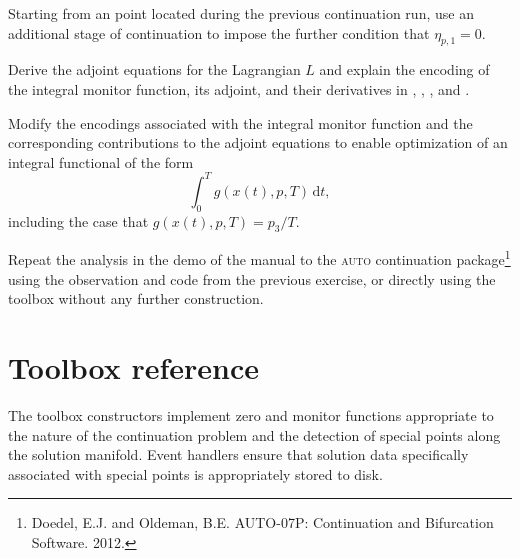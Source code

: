 \begin{exercises}
\item Starting from an  point located during the previous continuation run, use an additional stage of continuation to impose the further condition that $\eta_{p,1}=0$.
\item Derive the adjoint equations for the Lagrangian $L$ and explain the encoding of the integral monitor function, its adjoint, and their derivatives in , , , and .
\item Modify the encodings associated with the integral monitor function and the corresponding contributions to the adjoint equations to enable optimization of an integral functional of the form
\[
\int_0^T g(x(t),p,T)\,\mathrm{d}t,
\]
including the case that $g(x(t),p,T)=p_3/T$.
\item Repeat the analysis in the  demo of the manual to the \textsc{auto} continuation package\footnote{Doedel, E.J. and Oldeman, B.E. AUTO-07P: Continuation and Bifurcation Software. 2012.} using the observation and code from the previous exercise, or directly using the  toolbox without any further construction.
\end{exercises}


\section{Toolbox reference}
The toolbox constructors implement zero and monitor functions appropriate to the nature of the continuation problem and the detection of special points along the solution manifold. Event handlers ensure that solution data specifically associated with special points is appropriately stored to disk.


